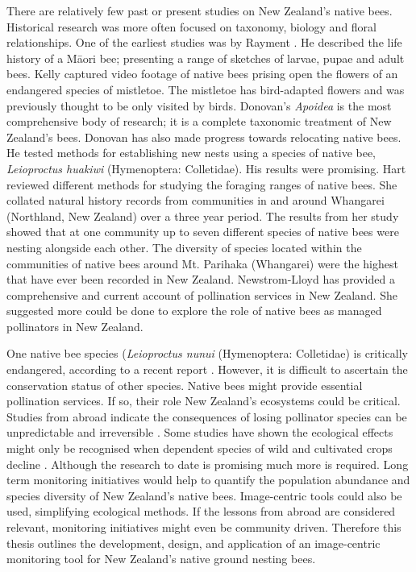 There are relatively few past or present studies on New Zealand's native bees. Historical research was more often focused on taxonomy, biology and floral relationships. One of the earliest studies was by Rayment \cite{Rayment1935}. He described the life history of a M\={a}ori bee; presenting a range of sketches of larvae, pupae and adult bees. Kelly \cite{Kelly1996} captured   video footage of native bees prising open the flowers of an endangered species of mistletoe. The mistletoe has bird-adapted flowers and was previously thought to be only visited by birds.
Donovan's \emph{Apoidea} \cite{Donovan2007} is the most comprehensive body of research; it is a complete taxonomic treatment of New Zealand's bees. Donovan \cite{Donovan2010} has also made progress towards relocating native bees. He tested methods for establishing new nests using a species of native bee, \emph{Leioproctus huakiwi} (Hymenoptera: Colletidae). His results were promising. Hart \cite{Hart2004,Hart2007} reviewed different methods for studying the foraging ranges of native bees. She collated natural history records from communities in and around Whangarei (Northland, New Zealand) over a three year period. The results from her study showed that at one community up to seven different species of native bees were nesting alongside each other. The diversity of species located within the communities of native bees around Mt. Parihaka (Whangarei) were the highest that have ever been recorded in New Zealand. Newstrom-Lloyd \cite{NewstromL2013} has provided a comprehensive and current account of pollination services in New Zealand. She suggested more could be done to explore the role of native bees as managed pollinators in New Zealand. 

One native bee species (\emph{Leioproctus nunui} (Hymenoptera: Colletidae) is critically endangered, according to a recent report \cite{Ward2012}. However, it is difficult to ascertain the conservation status of other species. Native bees might provide essential pollination services. If so, their role New Zealand's ecosystems could be critical. Studies from abroad indicate the consequences of losing pollinator species can be unpredictable and irreversible \cite{Kevan2003}. Some studies have shown the ecological effects might only be  recognised when dependent species of wild and cultivated crops decline \cite{Kevan2003}. Although the research to date is promising \cite{Hart2007, Donovan2010, NewstromL2013} much more is required. Long term monitoring initiatives would help to quantify the population abundance and species diversity of New Zealand's native bees. Image-centric tools could also be used, simplifying ecological methods. If the lessons from abroad are considered relevant, monitoring initiatives might even be community driven. Therefore this thesis outlines the development, design, and application of an image-centric monitoring tool for New Zealand's native ground nesting bees.

